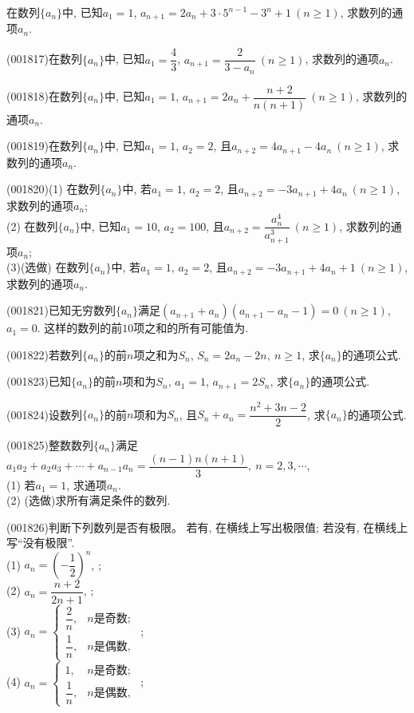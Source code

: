 在数列$\{a_n\}$中, 已知$a_1=1$, $a_{n+1}=2a_n+3\cdot 5^{n-1}-3^n+1\ (n\ge 1)$, 求数列的通项$a_n$.
\item (001817)在数列$\{a_n\}$中, 已知$a_1=\dfrac{4}{3}$, $a_{n+1}=\dfrac{2}{3-a_n} \ (n\ge 1)$, 求数列的通项$a_n$.
\item (001818)在数列$\{a_n\}$中, 已知$a_1=1$, $a_{n+1}=2a_n+\dfrac{n+2}{n(n+1)} \ (n\ge 1)$, 求数列的通项$a_n$.
\item (001819)在数列$\{a_n\}$中, 已知$a_1=1$, $a_2=2$, 且$a_{n+2}=4a_{n+1}-4a_n\ (n\ge 1)$, 求数列的通项$a_n$.
\item (001820)(1) 在数列$\{a_n\}$中, 若$a_1=1$, $a_2=2$, 且$a_{n+2}=-3a_{n+1}+4a_n\ (n\ge 1)$, 求数列的通项$a_n$;\\ 
(2) 在数列$\{a_n\}$中, 已知$a_1=10$, $a_2=100$, 且$a_{n+2}=\dfrac{a_n^4}{a_{n+1}^{3}}\ (n\ge 1)$, 求数列的通项$a_n$;\\ 
(3)(选做) 在数列$\{a_n\}$中, 若$a_1=1$, $a_2=2$, 且$a_{n+2}=-3a_{n+1}+4a_n+1\ (n\ge 1)$, 求数列的通项$a_n$.
\item (001821)已知无穷数列$\{a_n\}$满足$(a_{n+1}+a_n)(a_{n+1}-a_n-1)=0 \ (n\ge 1)$, $a_1=0$.
这样的数列的前$10$项之和的所有可能值为.
\item (001822)若数列$\{a_n\}$的前$n$项之和为$S_n$, $S_n=2a_n-2n, \ n\ge 1$, 求$\{a_n\}$的通项公式.
\item (001823)已知$\{a_n\}$的前$n$项和为$S_n$, $a_1=1$, $a_{n+1}=2S_n$, 求$\{a_n\}$的通项公式.
\item (001824)设数列$\{a_n\}$的前$n$项和为$S_n$, 且$S_n+a_n=\dfrac{n^2+3n-2}{2}$, 求$\{a_n\}$的通项公式.
\item (001825)整数数列$\{a_n\}$满足$a_1a_2+a_2a_3+\cdots+a_{n-1}a_n=\dfrac{(n-1)n(n+1)}{3}, \ n=2,3,\cdots$,\\ 
(1) 若$a_1=1$, 求通项$a_n$.\\ 
(2) (选做)求所有满足条件的数列.
\item (001826)判断下列数列是否有极限。 若有, 在横线上写出极限值; 若没有, 在横线上写``没有极限''.\\ 
(1) $a_n=(-\dfrac{1}{2})^n$, ;\\ 
(2) $a_n=\dfrac{n+2}{2n+1}$, ;\\ 
(3) $a_n=\left\{\begin{array}{ll}\dfrac{2}{n},& n\mbox{是奇数};\\\dfrac{1}{n},& n\mbox{是偶数},\end{array}\right.$ ;\\ 
(4) $a_n=\left\{\begin{array}{ll}1,& n\mbox{是奇数};\\\dfrac{1}{n},& n\mbox{是偶数},\end{array}\right.$ ;\\ 
